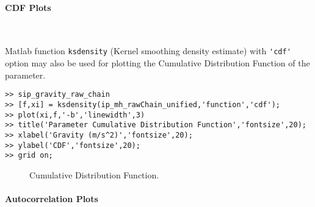 

\paragraph{CDF Plots} \

Matlab function \verb+ksdensity+ (Kernel smoothing density estimate) with \verb+'cdf'+ option may also be used for plotting the Cumulative Distribution Function of the parameter.


\begin{lstlisting}[label=matlab:cdf,caption={Matlab code for the CDF plot.}]
% inside Matlab
>> sip_gravity_raw_chain
>> [f,xi] = ksdensity(ip_mh_rawChain_unified,'function','cdf');
>> plot(xi,f,'-b','linewidth',3)
>> title('Parameter Cumulative Distribution Function','fontsize',20);
>> xlabel('Gravity (m/s^2)','fontsize',20);
>> ylabel('CDF','fontsize',20);
>> grid on;
\end{lstlisting}

\begin{figure}[p]
\centering 
{}
\vspace*{-10pt}
\caption{Cumulative Distribution Function. }
\end{figure}

\paragraph{Autocorrelation Plots}\


